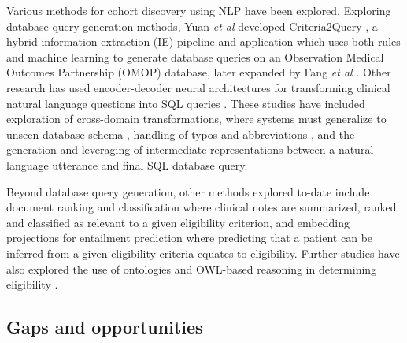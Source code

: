 \documentclass[../main.tex]{subfiles}
\begin{document}
Various methods for cohort discovery using NLP have been explored. Exploring database query generation methods, Yuan \textit{et al} developed Criteria2Query \cite{yuan2019criteria2query}, a hybrid information extraction (IE) pipeline and application which uses both rules and machine learning to generate database queries on an Observation Medical Outcomes Partnership (OMOP) \cite{hripcsak2015observational} database, later expanded by Fang \textit{et al} \cite{fang2022combining}. Other research has used encoder-decoder neural architectures for transforming clinical natural language questions into SQL queries \cite{bae2021question, park2021knowledge, wang2020text, pan2021bert, dhayne2021emr2vec}. These studies have included exploration of cross-domain transformations, where systems must generalize to unseen database schema \cite{park2021knowledge}, handling of typos and abbreviations \cite{bae2021question}, and the generation and leveraging of intermediate representations between a natural language utterance and final SQL database query.\cite{pan2021bert} 

Beyond database query generation, other methods explored to-date include document ranking and classification \cite{chen2019clinical,soni2020patient} where clinical notes are summarized, ranked and classified as relevant to a given eligibility criterion, and embedding projections for entailment prediction \cite{dhayne2021emr2vec, zhang2020deepenroll} where predicting that a patient can be inferred from a given eligibility criteria equates to eligibility. Further studies have also explored the use of ontologies and OWL-based reasoning in determining eligibility \cite{patel2007matching, huang2013semanticct, baader2018patient, johnson2016mimic, patrao2015recruit}.
    
\subsection*{Gaps and opportunities}
\end{document}
